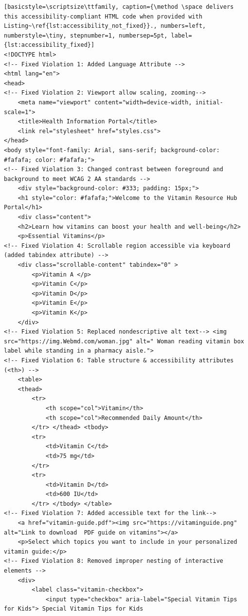 \documentclass[sigconf, nonacm]{acmart}
\newcommand{\method}{\emph{AccessGuru}}
\begin{document}
\newpage
\hspace{0.04\textwidth} 
\begin{minipage}[t]{0.50\textwidth}
{\small
\begin{lstlisting}[basicstyle=\scriptsize\ttfamily, caption={\method \space delivers this accessibility-compliant HTML code when provided with Listing~\ref{lst:accessibility_not_fixed}}., numbers=left, numberstyle=\tiny, stepnumber=1, numbersep=5pt, label={lst:accessibility_fixed}]
<!DOCTYPE html>
<!-- Fixed Violation 1: Added Language Attribute -->
<html lang="en">
<head>
<!-- Fixed Violation 2: Viewport allow scaling, zooming-->
    <meta name="viewport" content="width=device-width, initial-scale=1">
    <title>Health Information Portal</title>
    <link rel="stylesheet" href="styles.css">
</head>
<body style="font-family: Arial, sans-serif; background-color: #fafafa; color: #fafafa;">
<!-- Fixed Violation 3: Changed contrast between foreground and background to meet WCAG 2 AA standards -->
    <div style="background-color: #333; padding: 15px;">
    <h1 style="color: #fafafa;">Welcome to the Vitamin Resource Hub Portal</h1>
    <div class="content">
    <h2>Learn how vitamins can boost your health and well-being</h2>
    <p>Essential Vitamins</p>
<!-- Fixed Violation 4: Scrollable region accessible via keyboard (added tabindex attribute) -->
    <div class="scrollable-content" tabindex="0" >     
        <p>Vitamin A </p>
        <p>Vitamin C</p>
        <p>Vitamin D</p>
        <p>Vitamin E</p>
        <p>Vitamin K</p>
    </div>
<!-- Fixed Violation 5: Replaced nondescriptive alt text--> <img src="https://img.Webmd.com/woman.jpg" alt=" Woman reading vitamin box label while standing in a pharmacy aisle.">
<!-- Fixed Violation 6: Table structure & accessibility attributes (<th>) -->
    <table>
    <thead>
        <tr>
            <th scope="col">Vitamin</th>
            <th scope="col">Recommended Daily Amount</th>
        </tr> </thead> <tbody>
        <tr>
            <td>Vitamin C</td>
            <td>75 mg</td>
        </tr>
        <tr>
            <td>Vitamin D</td>
            <td>600 IU</td>
        </tr> </tbody> </table>
<!-- Fixed Violation 7: Added accessible text for the link-->
    <a href="vitamin-guide.pdf"><img src="https://vitaminguide.png" alt="Link to download  PDF guide on vitamins"></a>
    <p>Select which topics you want to include in your personalized vitamin guide:</p>
<!-- Fixed Violation 8: Removed improper nesting of interactive elements -->
    <div>
        <label class="vitamin-checkbox">
            <input type="checkbox" aria-label="Special Vitamin Tips for Kids"> Special Vitamin Tips for Kids

\end{lstlisting}}
\end{minipage}
\end{document}
